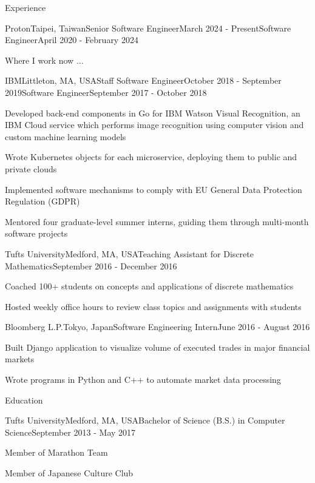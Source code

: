\documentclass{resume}
\begin{document}
  \begin{rSection}{Experience}
    \begin{rSubsection}{Proton}{Taipei, Taiwan}{Senior Software Engineer}{March 2024 - Present}{Software Engineer}{April 2020 - February 2024}
    \item Where I work now ...
    \end{rSubsection}

    \begin{rSubsection}{IBM}{Littleton, MA, USA}{Staff Software Engineer}{October 2018 - September 2019}{Software Engineer}{September 2017 - October 2018}
    \item Developed back-end components in Go for IBM Watson Visual Recognition, an IBM Cloud service which performs image recognition using computer vision and custom machine learning models
    \item Wrote Kubernetes objects for each microservice, deploying them to public and private clouds
    \item Implemented software mechanisms to comply with EU General Data Protection Regulation (GDPR)
    \item Mentored four graduate-level summer interns, guiding them through multi-month software projects
    \end{rSubsection}
    
    \begin{rSubsection}{Tufts University}{Medford, MA, USA}{Teaching Assistant for Discrete Mathematics}{September 2016 - December 2016}{}{}
    \item Coached 100+ students on concepts and applications of discrete mathematics
    \item Hosted weekly office hours to review class topics and assignments with students
    \end{rSubsection} 
    
    \begin{rSubsection}{Bloomberg L.P.}{Tokyo, Japan}{Software Engineering Intern}{June 2016 - August 2016}{}{}
    \item Built Django application to visualize volume of executed trades in major financial markets
    \item Wrote programs in Python and C++ to automate market data processing
    \end{rSubsection}
  
  \end{rSection}

  \begin{rSection}{Education}
    \begin{rSubsection}{Tufts University}{Medford, MA, USA}{Bachelor of Science (B.S.) in Computer Science}{September 2013 - May 2017}{}{}
      \item Member of Marathon Team
      \item Member of Japanese Culture Club
      \end{rSubsection}
  \end{rSection}
  
\end{document}
